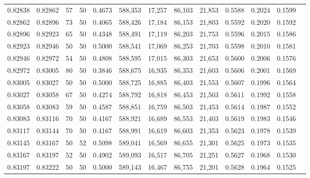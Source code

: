 \begin{tabular}{rrrrrrrrrrrrr}
0.82838 & 0.82862 &    57 &  50 &                                     0.4673 & 588,353 &  17,257 &  86,103 &  21,853 & 0.5588 & 0.2024 & 0.1599 \\
0.82862 & 0.82896 &    73 &  50 &                                     0.4065 & 588,426 &  17,184 &  86,153 &  21,803 & 0.5592 & 0.2020 & 0.1592 \\
0.82896 & 0.82923 &    65 &  50 &                                     0.4348 & 588,491 &  17,119 &  86,203 &  21,753 & 0.5596 & 0.2015 & 0.1586 \\
0.82923 & 0.82946 &    50 &  50 &                                     0.5000 & 588,541 &  17,069 &  86,253 &  21,703 & 0.5598 & 0.2010 & 0.1581 \\
0.82946 & 0.82972 &    54 &  50 &                                     0.4808 & 588,595 &  17,015 &  86,303 &  21,653 & 0.5600 & 0.2006 & 0.1576 \\
0.82972 & 0.83005 &    80 &  50 &                                     0.3846 & 588,675 &  16,935 &  86,353 &  21,603 & 0.5606 & 0.2001 & 0.1569 \\
0.83005 & 0.83027 &    50 &  50 &                                     0.5000 & 588,725 &  16,885 &  86,403 &  21,553 & 0.5607 & 0.1996 & 0.1564 \\
0.83027 & 0.83058 &    67 &  50 &                                     0.4274 & 588,792 &  16,818 &  86,453 &  21,503 & 0.5611 & 0.1992 & 0.1558 \\
0.83058 & 0.83083 &    59 &  50 &                                     0.4587 & 588,851 &  16,759 &  86,503 &  21,453 & 0.5614 & 0.1987 & 0.1552 \\
0.83083 & 0.83116 &    70 &  50 &                                     0.4167 & 588,921 &  16,689 &  86,553 &  21,403 & 0.5619 & 0.1983 & 0.1546 \\
0.83117 & 0.83144 &    70 &  50 &                                     0.4167 & 588,991 &  16,619 &  86,603 &  21,353 & 0.5623 & 0.1978 & 0.1539 \\
0.83145 & 0.83167 &    50 &  52 &                                     0.5098 & 589,041 &  16,569 &  86,655 &  21,301 & 0.5625 & 0.1973 & 0.1535 \\
0.83167 & 0.83197 &    52 &  50 &                                     0.4902 & 589,093 &  16,517 &  86,705 &  21,251 & 0.5627 & 0.1968 & 0.1530 \\
0.83197 & 0.83222 &    50 &  50 &                                     0.5000 & 589,143 &  16,467 &  86,755 &  21,201 & 0.5628 & 0.1964 & 0.1525 \\

\end{tabular}
